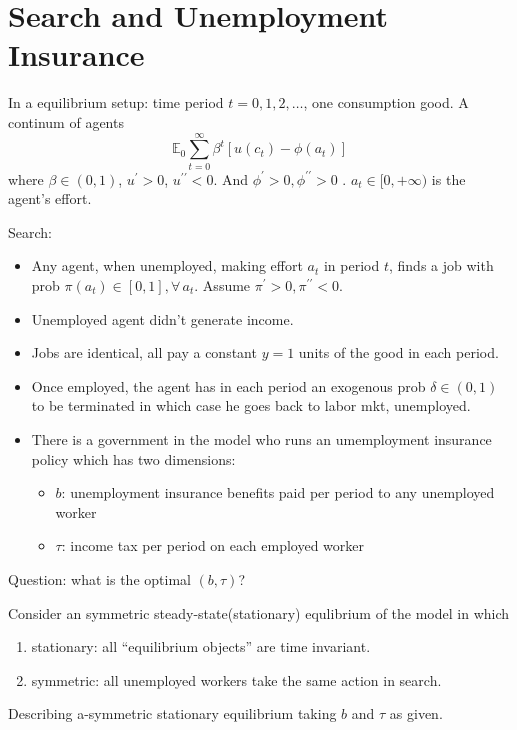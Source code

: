 \chapter{Search and Unemployment Insurance}
In a equilibrium setup: time period $t=0,1,2,\ldots$, one consumption good. A continum of agents
\begin{equation}
\mathbb{E}_{0}\sum_{t=0}^{\infty} \beta ^{t} [u(c_{t})-\phi(a_{t})]
\end{equation}
where $\beta \in (0,1)$, $u^{\prime} > 0$, $u^{\prime\prime}<0$. And $\phi^{\prime} > 0,\phi^{\prime\prime}>0$ . $a_{t}\in [0,+\infty)$ is the agent\rq s effort.

Search:
\begin{itemize}
    \item Any agent, when unemployed, making effort $a_{t}$ in period $t$, finds a job with prob $\pi(a_{t})\in [0,1],\forall\,a_{t}$. Assume $\pi^{\prime} > 0, \pi^{\prime\prime}<0$.
    \item Unemployed agent didn't generate income.
    \item Jobs are identical, all pay a constant $y=1$ units of the good in each period.
    \item Once employed, the agent has in each period an exogenous prob $\delta\in (0,1)$ to be terminated in which case he goes back to labor mkt, unemployed.
    \item There is a government in the model who runs an umemployment insurance policy which has two dimensions:
    \begin{itemize}
        \item $b$: unemployment insurance benefits paid per period to any unemployed worker
        \item $\tau$: income tax per period on each employed worker
    \end{itemize}
\end{itemize}

Question: what is the optimal $(b,\tau)$?

Consider an symmetric steady-state(stationary) equlibrium of the model in which
\begin{enumerate}
    \item stationary: all ``equilibrium objects'' are time invariant.
    \item symmetric: all unemployed workers take the same action in search.
\end{enumerate}

Describing a-symmetric stationary equilibrium taking $b$ and $\tau$ as given.

